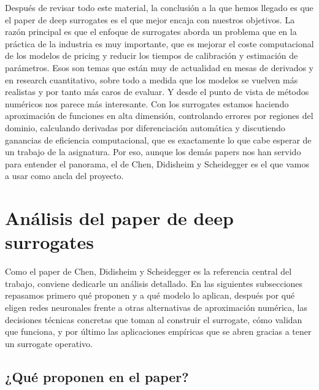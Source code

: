 \documentclass[11pt,a4paper]{article}
\begin{document}
Después de revisar todo este material, la conclusión a la que hemos llegado es que el paper de deep surrogates es el que mejor encaja con nuestros objetivos. La razón principal es que el enfoque de surrogates aborda un problema que en la práctica de la industria es muy importante, que es mejorar el coste computacional de los modelos de pricing y reducir los tiempos de calibración y estimación de parámetros. Esos son temas que están muy de actualidad en mesas de derivados y en research cuantitativo, sobre todo a medida que los modelos se vuelven más realistas y por tanto más caros de evaluar. Y desde el punto de vista de métodos numéricos nos parece más interesante. Con los surrogates estamos haciendo aproximación de funciones en alta dimensión, controlando errores por regiones del dominio, calculando derivadas por diferenciación automática y discutiendo ganancias de eficiencia computacional, que es exactamente lo que cabe esperar de un trabajo de la asignatura. Por eso, aunque los demás papers nos han servido para entender el panorama, el de Chen, Didisheim y Scheidegger es el que vamos a usar como ancla del proyecto.

\section{Análisis del paper de deep surrogates}

Como el paper de Chen, Didisheim y Scheidegger es la referencia central del trabajo, conviene dedicarle un análisis detallado. En las siguientes subsecciones repasamos primero qué proponen y a qué modelo lo aplican, después por qué eligen redes neuronales frente a otras alternativas de aproximación numérica, las decisiones técnicas concretas que toman al construir el surrogate, cómo validan que funciona, y por último las aplicaciones empíricas que se abren gracias a tener un surrogate operativo.

\subsection{¿Qué proponen en el paper?}
\end{document}
